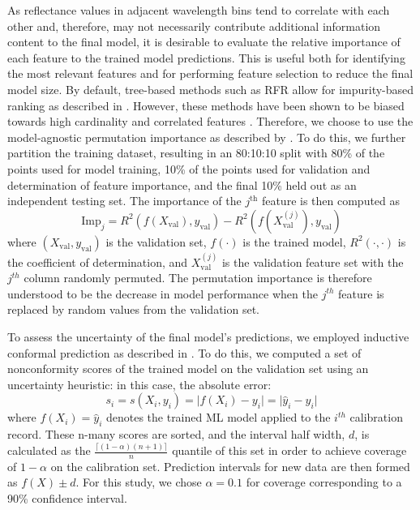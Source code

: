 As reflectance values in adjacent wavelength bins tend to correlate with each other and, therefore, may not necessarily contribute additional information content to the final model, it is desirable to evaluate the relative importance of each feature to the trained model predictions. This is useful both for identifying the most relevant features and for performing feature selection to reduce the final model size. By default, tree-based methods such as RFR allow for impurity-based ranking as described in \cite{random-forest, rfr-importance-ranking}. However, these methods have been shown to be biased towards high cardinality and correlated features \cite{strobl2008conditional}. Therefore, we choose to use the model-agnostic permutation importance as described by \cite{parr2018beware}. To do this, we further partition the training dataset, resulting in an 80:10:10 split with 80\% of the points used for model training, 10\% of the points used for validation and determination of feature importance, and the final 10\% held out as an independent testing set. The importance of the $j^{\text{th}}$ feature is then computed as
\begin{equation}
    \text{Imp}_j = R^2(f(X_{\text{val}}), y_{\text{val}}) - R^2(f(X_{\text{val}}^{(j)}), y_{\text{val}})
\end{equation}
where $(X_{\text{val}}, y_{\text{val}})$ is the validation set, $f(\cdot)$ is the trained model, $R^2(\cdot, \cdot)$ is the coefficient of determination, and $X_{\text{val}}^{(j)}$ is the validation feature set with the $j^{th}$ column randomly permuted. The permutation importance is therefore understood to be the decrease in model performance when the $j^{th}$ feature is replaced by random values from the validation set.

To assess the uncertainty of the final model's predictions, we employed inductive conformal prediction as described in \cite{conformal-prediction-1, conformal-prediction-2, conformal-prediction-3, conformal-prediction-4}. To do this, we computed a set of nonconformity scores of the trained model on the validation set using an uncertainty heuristic: in this case, the absolute error:
\begin{equation}
    s_i = s(X_i, y_i) = \lvert f(X_i) - y_i \rvert = \lvert \hat{y}_i - y_i \rvert
\end{equation}
where $f(X_i)=\hat{y}_i$ denotes the trained ML model applied to the $i^{th}$ calibration record. These n-many scores are sorted, and the interval half width, $d$, is calculated as the $\frac{\lceil(1-\alpha)(n+1) \rceil}{n}$ quantile of this set in order to achieve coverage of $1-\alpha$ on the calibration set. Prediction intervals for new data are then formed as $f(X)\pm d$. For this study, we chose $\alpha=0.1$ for coverage corresponding to a 90\% confidence interval.

